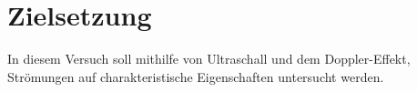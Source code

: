\section{Zielsetzung}

\label{sec:Zielsetzung}

In diesem Versuch soll mithilfe von Ultraschall und dem Doppler-Effekt, Strömungen auf charakteristische Eigenschaften untersucht werden. 
